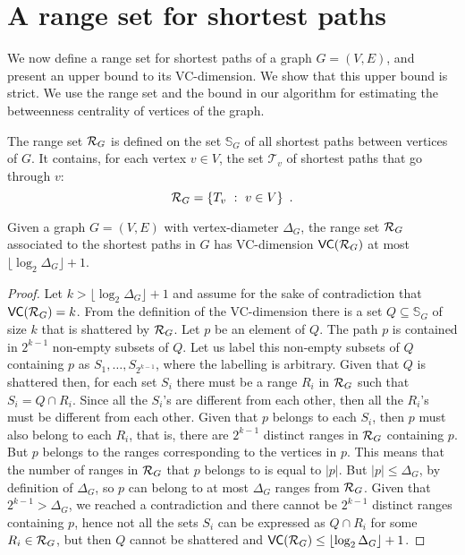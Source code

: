 \section{A range set for shortest paths}\label{sec:rangeset}
We now define a range set for shortest paths of a graph $G=(V,E)$, and present 
an upper bound to its VC-dimension. We show that this upper bound is strict. We
use the range set and the bound in our algorithm for estimating the betweenness
centrality of vertices of the graph.

The range set $\mathcal{R}_G$ is defined on the set $\mathbb{S}_G$ of all shortest
paths between vertices of $G$. It contains, for each vertex $v\in V$, the set
$\mathcal{T}_v$  of shortest paths that go through $v$:
\[
\mathcal{R}_G = \{T_v ~:~ v\in V\}\enspace.
\]

\begin{lemma}\label{lem:vcdimuppbound}
  Given a graph $G=(V,E)$ with vertex-diameter $\Delta_G$, the range set
  $\mathcal{R}_G$ associated to the shortest paths in $G$ has VC-dimension
  $\mathsf{VC}(\mathcal{R}_G)$ at most $\lfloor\log_2\Delta_G\rfloor+1$.
\end{lemma}

\begin{proof}
Let $k>\lfloor\log_2\Delta_G\rfloor+1$ and assume for the sake of contradiction
that $\mathsf{VC}(\mathcal{R}_G)=k$. From the definition of the VC-dimension there is a set
$Q\subseteq\mathbb{S}_G$ of size $k$ that is shattered by $\mathcal{R}_G$. Let $p$ be
an element of $Q$. The path $p$ is contained in $2^{k-1}$ non-empty subsets of
$Q$. Let us label this non-empty subsets of $Q$ containing $p$ as
$S_1,\dotsc,S_{2^{k-1}}$, where the labelling is arbitrary.
Given that $Q$ is shattered then, for each set $S_i$ there must be a range $R_i$ in
$\mathcal{R}_G$ such that $S_i=Q\cap R_i$. Since all the $S_i$'s are
different from each other, then all the $R_i$'s must be different from each
other. Given that $p$ belongs to each $S_i$, then $p$ must also belong to each
$R_i$, that is, there are $2^{k-1}$ distinct ranges in $\mathcal{R}_G$ containing
$p$. But $p$ belongs to the ranges corresponding to the vertices in $p$. This means that the number of ranges
in $\mathcal{R}_G$ that $p$ belongs to is equal to $|p|$. But $|p|\le\Delta_G$, by definition of $\Delta_G$, so $p$
can belong to at most $\Delta_G$ ranges from $\mathcal{R}_G$. Given that
$2^{k-1}>\Delta_G$, we reached a contradiction and there cannot be $2^{k-1}$
distinct ranges containing $p$, hence not all the sets $S_i$ can be expressed as
$Q\cap R_i$ for some $R_i\in\mathcal{R}_G$, but then $Q$ cannot be shattered and
$\mathsf{VC}(\mathcal{R}_G)\le\lfloor\log_2\Delta_G\rfloor+1$.%
\end{proof}


